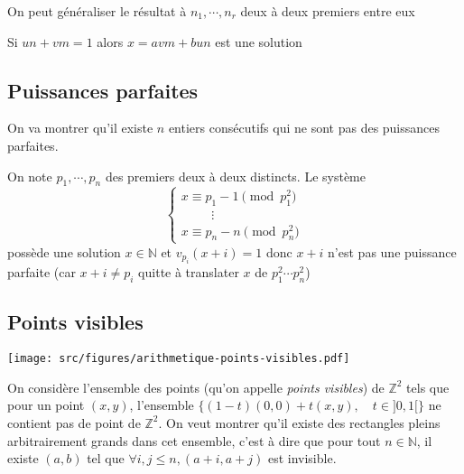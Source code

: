 \begin{rem}
    On peut généraliser le résultat à $n_1, \cdots, n_r$ deux à deux premiers entre eux
\end{rem}

\begin{rem}
    Si $un+vm=1$ alors $x=avm+bun$ est une solution
\end{rem}

\subsection{Puissances parfaites}

On va montrer qu'il existe $n$ entiers consécutifs qui ne sont pas des puissances parfaites.

On note $p_1, \cdots, p_n$ des premiers deux à deux distincts. Le système \[
    \begin{cases}
        x\equiv p_1-1\pmod {p_1^2}\\
        \hspace{1cm}\vdots\\
        x\equiv p_n-n\pmod{p_n^2}
    \end{cases}
\]
possède une solution $x\in\mathbb N$ et $v_{p_i}(x+i)=1$ donc $x+i$ n'est pas une puissance parfaite (car $x+i\neq p_i$ quitte à translater $x$ de $p_1^2\cdots p_n^2$)

\subsection{Points visibles}

\begin{center}
    \texttt{[image: src/figures/arithmetique-points-visibles.pdf]}
\end{center}

On considère l'ensemble des points (qu'on appelle \emph{points visibles}) de $\mathbb Z^2$ tels que pour un point $(x, y)$, l'ensemble $\{(1-t)(0, 0)+t(x, y), \quad t\in ]0, 1[\}$ ne contient pas de point de $\mathbb Z^2$. On veut montrer qu'il existe des rectangles pleins arbitrairement grands dans cet ensemble, c'est à dire que pour tout $n\in\mathbb N$, il existe $(a, b)$ tel que $\forall i, j\leq n, (a+i, a+j)$ est invisible.

